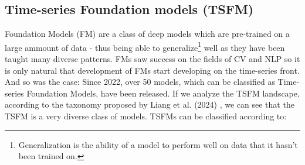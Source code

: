 \subsection{Time-series Foundation models (TSFM)}

Foundation Models (FM) are a class of deep models which are pre-trained on a large ammount of data - thus being able to generalize\footnote{Generalization is the ability of a model to perform well on data that it hasn't been trained on.} well as they have been taught many diverse patterns. FMs saw success on the fields of CV and NLP so it is only natural that development of FMs start developing on the time-series front. And so was the case: Since 2022, over 50 models, which can be classified as Time-series Foundation Models, have been released. If we analyze the TSFM landscape, according to the taxonomy proposed by Liang et al. (2024) \cite{liang2024foundation}, we can see that the TSFM is a very diverse class of models. TSFMs can be classified according to:

